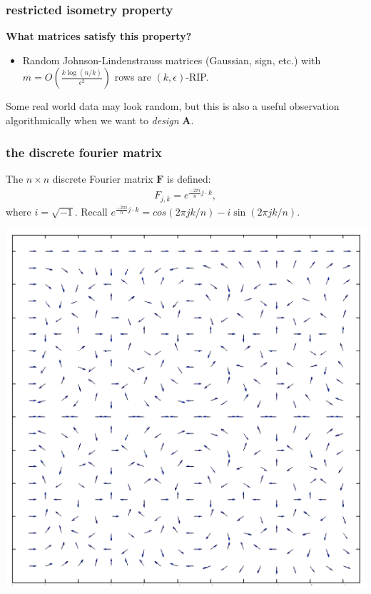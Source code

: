 \documentclass[compress]{beamer}
\newcommand{\bv}[1]{\mathbf{#1}}
\begin{document}
\begin{frame}
	\frametitle{restricted isometry property}
	\begin{center}
		\textbf{What matrices satisfy this property?}
	\end{center}
	\begin{itemize}
		\item Random Johnson-Lindenstrauss matrices (Gaussian, sign, etc.) with $m = O(\frac{k\log(n/k)}{\epsilon^2})$ rows are $(k,\epsilon)$-RIP. 
	\end{itemize}
	
	Some real world data may look random, but this is also a useful observation algorithmically when we want to \emph{design} $\bv{A}$.
\end{frame}



\begin{frame}
	\frametitle{the discrete fourier matrix}
	The $n \times n$ discrete Fourier matrix $\bv{F}$ is defined:
	\begin{align*}
		F_{j,k} = e^{\frac{-2\pi i}{n}j\cdot k}, 
	\end{align*}
	where $i = \sqrt{-1}$. Recall  $e^{\frac{-2\pi i}{n}j\cdot k} = cos(2\pi j k/n) - i \sin(2\pi j k/n)$.
	\begin{center}
		\includegraphics[width=.4\textwidth]{dftMatrix.png}
	\end{center}
\end{frame}
\end{document}
